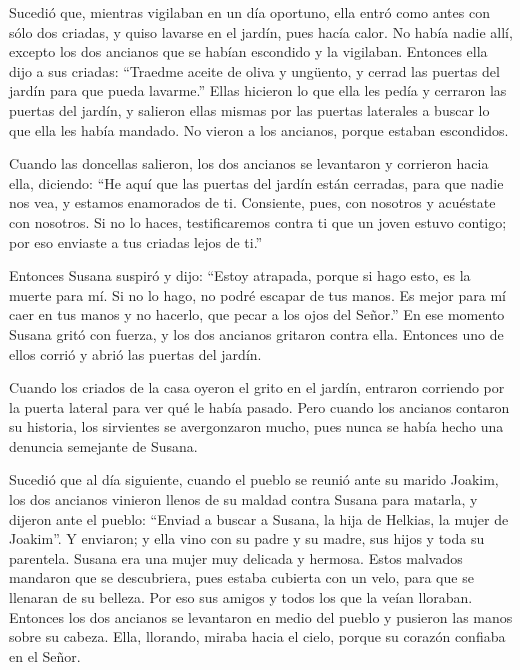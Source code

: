  Sucedió que, mientras vigilaban en un día oportuno, ella
entró como antes con sólo dos criadas, y quiso lavarse en el jardín,
pues hacía calor.  No había nadie allí, excepto los dos
ancianos que se habían escondido y la vigilaban. 
Entonces ella dijo a sus criadas: ``Traedme aceite de oliva y ungüento,
y cerrad las puertas del jardín para que pueda lavarme.''
 Ellas hicieron lo que ella les pedía y cerraron las
puertas del jardín, y salieron ellas mismas por las puertas laterales a
buscar lo que ella les había mandado. No vieron a los ancianos, porque
estaban escondidos.

 Cuando las doncellas salieron, los dos ancianos se
levantaron y corrieron hacia ella, diciendo:  ``He aquí
que las puertas del jardín están cerradas, para que nadie nos vea, y
estamos enamorados de ti. Consiente, pues, con nosotros y acuéstate con
nosotros.  Si no lo haces, testificaremos contra ti que
un joven estuvo contigo; por eso enviaste a tus criadas lejos de ti.''

 Entonces Susana suspiró y dijo: ``Estoy atrapada, porque
si hago esto, es la muerte para mí. Si no lo hago, no podré escapar de
tus manos.  Es mejor para mí caer en tus manos y no
hacerlo, que pecar a los ojos del Señor.''  En ese
momento Susana gritó con fuerza, y los dos ancianos gritaron contra
ella.  Entonces uno de ellos corrió y abrió las puertas
del jardín.

 Cuando los criados de la casa oyeron el grito en el
jardín, entraron corriendo por la puerta lateral para ver qué le había
pasado.  Pero cuando los ancianos contaron su historia,
los sirvientes se avergonzaron mucho, pues nunca se había hecho una
denuncia semejante de Susana.

 Sucedió que al día siguiente, cuando el pueblo se reunió
ante su marido Joakim, los dos ancianos vinieron llenos de su maldad
contra Susana para matarla,  y dijeron ante el pueblo:
``Enviad a buscar a Susana, la hija de Helkias, la mujer de Joakim''. Y
enviaron;  y ella vino con su padre y su madre, sus hijos
y toda su parentela.  Susana era una mujer muy delicada y
hermosa.  Estos malvados mandaron que se descubriera,
pues estaba cubierta con un velo, para que se llenaran de su belleza.
 Por eso sus amigos y todos los que la veían lloraban.
 Entonces los dos ancianos se levantaron en medio del
pueblo y pusieron las manos sobre su cabeza.  Ella,
llorando, miraba hacia el cielo, porque su corazón confiaba en el Señor.

